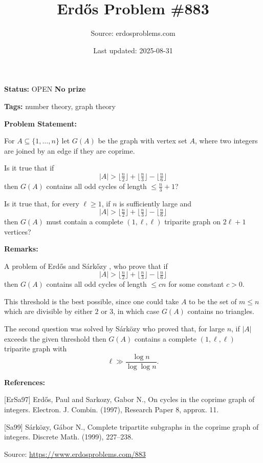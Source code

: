 \documentclass{article}
\title{Erd\H{o}s Problem \#883}
\date{Last updated: 2025-08-31}
\author{Source: erdosproblems.com}
\begin{document}
\maketitle

\noindent\textbf{Status:} OPEN \quad \textbf{No prize}

\noindent\textbf{Tags:} number theory, graph theory

\medskip
\noindent\textbf{Problem Statement:}

For $A\subseteq \{1,\ldots,n\}$ let $G(A)$ be the graph with vertex set $A$, where two integers are joined by an edge if they are coprime.

Is it true that if\[\lvert A\rvert >\lfloor\tfrac{n}{2}\rfloor+\lfloor\tfrac{n}{3}\rfloor-\lfloor\tfrac{n}{6}\rfloor\]then $G(A)$ contains all odd cycles of length $\leq \frac{n}{3}+1$?

Is it true that, for every $\ell\geq 1$, if $n$ is sufficiently large and\[\lvert A\rvert >\lfloor\tfrac{n}{2}\rfloor+\lfloor\tfrac{n}{3}\rfloor-\lfloor\tfrac{n}{6}\rfloor\]then $G(A)$ must contain a complete $(1,\ell,\ell)$ triparite graph on $2\ell+1$ vertices?

\bigskip
\noindent\textbf{Remarks:}

A problem of Erd\H{o}s and S\'{a}rk\H{o}zy \cite{ErSa97}, who prove that if\[\lvert A\rvert >\lfloor\tfrac{n}{2}\rfloor+\lfloor\tfrac{n}{3}\rfloor-\lfloor\tfrac{n}{6}\rfloor\]then $G(A)$ contains all odd cycles of length $\leq cn$ for some constant $c>0$.

This threshold is the best possible, since one could take $A$ to be the set of $m\leq n$ which are divisible by either $2$ or $3$, in which case $G(A)$ contains no triangles. 

The second question was solved by S\'{a}rk\"{o}zy \cite{Sa99} who proved that, for large $n$, if $\lvert A\rvert$ exceeds the given threshold then $G(A)$ contains a complete $(1,\ell,\ell)$ triparite graph with\[\ell \gg \frac{\log n}{\log\log n}.\]

\bigskip
\noindent\textbf{References:}

[ErSa97] Erd\H{o}s, Paul and Sarkozy, Gabor N., On cycles in the coprime graph of integers. Electron. J. Combin. (1997), Research Paper 8, approx. 11.
 
 [Sa99] S\'{a}rk\"ozy, G\'{a}bor N., Complete tripartite subgraphs in the coprime graph of
integers. Discrete Math. (1999), 227--238.

\bigskip
\noindent\small{Source: \url{https://www.erdosproblems.com/883}}
\end{document}
